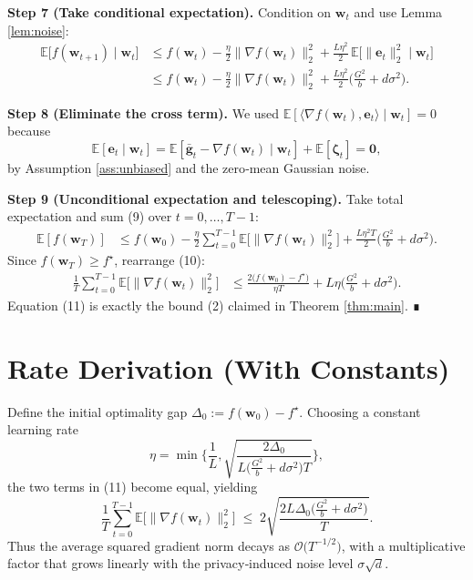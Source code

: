 \documentclass{article}
\begin{document}
\noindent\textbf{Step 7 (Take conditional expectation).}  
Condition on $\mathbf{w}_t$ and use Lemma \ref{lem:noise}:
\begin{align}
\mathbb{E}\big[f(\mathbf{w}_{t+1})\mid\mathbf{w}_t\big]
&\le f(\mathbf{w}_t)
   -\frac{\eta}{2}\|\nabla f(\mathbf{w}_t)\|_2^{2}
   +\frac{L\eta^{2}}{2}\,\mathbb{E}\big[\|\mathbf{e}_t\|_2^{2}\mid\mathbf{w}_t\big] \nonumber\\
&\le f(\mathbf{w}_t)
   -\frac{\eta}{2}\|\nabla f(\mathbf{w}_t)\|_2^{2}
   +\frac{L\eta^{2}}{2}\Big(\frac{G^{2}}{b}+d\sigma^{2}\Big). \tag{9}
\end{align}

\noindent\textbf{Step 8 (Eliminate the cross term).}  
We used $\mathbb{E}[\langle\nabla f(\mathbf{w}_t),\mathbf{e}_t\rangle\mid\mathbf{w}_t]=0$ because
\[
\mathbb{E}[\mathbf{e}_t\mid\mathbf{w}_t]
= \mathbb{E}[\bar{\mathbf{g}}_t-\nabla f(\mathbf{w}_t)\mid\mathbf{w}_t]
  +\mathbb{E}[\bm{\zeta}_t]=\mathbf{0},
\]
by Assumption \ref{ass:unbiased} and the zero‑mean Gaussian noise.

\noindent\textbf{Step 9 (Unconditional expectation and telescoping).}  
Take total expectation and sum (9) over $t=0,\dots,T-1$:
\begin{align}
\mathbb{E}[f(\mathbf{w}_T)]
&\le f(\mathbf{w}_0)
   -\frac{\eta}{2}\sum_{t=0}^{T-1}\mathbb{E}\big[\|\nabla f(\mathbf{w}_t)\|_2^{2}\big]
   +\frac{L\eta^{2}T}{2}\Big(\frac{G^{2}}{b}+d\sigma^{2}\Big). \tag{10}
\end{align}
Since $f(\mathbf{w}_T)\ge f^\star$, rearrange (10):
\begin{align}
\frac{1}{T}\sum_{t=0}^{T-1}\mathbb{E}\big[\|\nabla f(\mathbf{w}_t)\|_2^{2}\big]
&\le
\frac{2\big(f(\mathbf{w}_0)-f^\star\big)}{\eta T}
   +L\eta\Big(\frac{G^{2}}{b}+d\sigma^{2}\Big). \tag{11}
\end{align}
Equation (11) is exactly the bound (2) claimed in Theorem \ref{thm:main}.  ∎

\section*{Rate Derivation (With Constants)}
Define the initial optimality gap $\Delta_0:=f(\mathbf{w}_0)-f^\star$.  
Choosing a constant learning rate
\[
\eta = \min\Big\{\frac{1}{L},\sqrt{\frac{2\Delta_0}{L\big(\frac{G^{2}}{b}+d\sigma^{2}\big)T}}\Big\},
\]
the two terms in (11) become equal, yielding
\[
\frac{1}{T}\sum_{t=0}^{T-1}\mathbb{E}\big[\|\nabla f(\mathbf{w}_t)\|_2^{2}\big]
\;\le\;
2\sqrt{\frac{2L\Delta_0\big(\frac{G^{2}}{b}+d\sigma^{2}\big)}{T}}.
\]
Thus the average squared gradient norm decays as $\mathcal{O}\!\big(T^{-1/2}\big)$, with a multiplicative factor that grows linearly with the privacy‑induced noise level $\sigma\sqrt{d}$.
\end{document}

